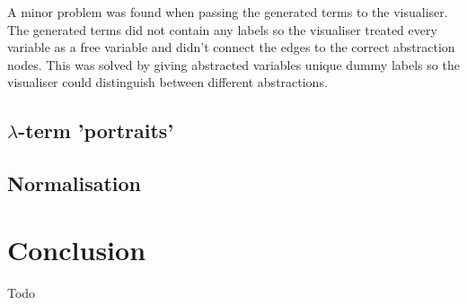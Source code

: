 \documentclass[11pt]{article}
\begin{document}
A minor problem was found when passing the generated terms to the visualiser. The generated terms did not contain any labels so the visualiser treated every variable as a free variable and didn't connect the edges to the correct abstraction nodes. This was solved by giving abstracted variables unique dummy labels so the visualiser could distinguish between different abstractions.


\subsection{\texorpdfstring{$\lambda$}{Lambda}-term 'portraits'}

\subsection{Normalisation}

\newpage

\section{Conclusion}
\label{sec:conclusion}
Todo

\newpage


\end{document}
